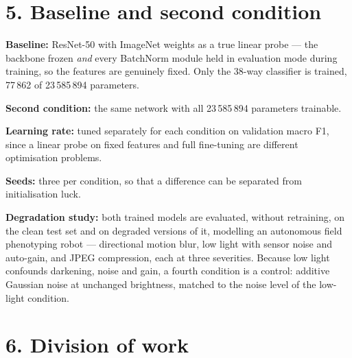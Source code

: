 \documentclass[10pt,a4paper]{article}
\begin{document}
\section*{5. Baseline and second condition}

\textbf{Baseline:} ResNet-50 with ImageNet weights as a true linear probe --- the backbone frozen
\emph{and} every BatchNorm module held in evaluation mode during training, so the features are
genuinely fixed. Only the 38-way classifier is trained, 77\,862 of 23\,585\,894 parameters.

\textbf{Second condition:} the same network with all 23\,585\,894 parameters trainable.

\textbf{Learning rate:} tuned separately for each condition on validation macro F1, since a linear
probe on fixed features and full fine-tuning are different optimisation problems.

\textbf{Seeds:} three per condition, so that a difference can be separated from initialisation luck.

\textbf{Degradation study:} both trained models are evaluated, without retraining, on the clean test
set and on degraded versions of it, modelling an autonomous field phenotyping robot --- directional
motion blur, low light with sensor noise and auto-gain, and JPEG compression, each at three
severities. Because low light confounds darkening, noise and gain, a fourth condition is a control:
additive Gaussian noise at unchanged brightness, matched to the noise level of the low-light
condition.

\section*{6. Division of work}
\end{document}
